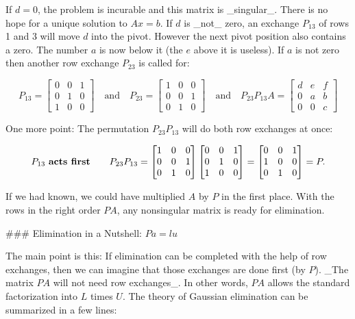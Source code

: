 If \(d=0\), the problem is incurable and this matrix is _singular_. There is no hope for a unique solution to \(Ax=b\). If \(d\) is _not_ zero, an exchange \(P_{13}\) of rows 1 and 3 will move \(d\) into the pivot. However the next pivot position also contains a zero. The number \(a\) is now below it (the \(e\) above it is useless). If \(a\) is not zero then another row exchange \(P_{23}\) is called for:

\[P_{13}=\begin{bmatrix}0&0&1\\ 0&1&0\\ 1&0&0\end{bmatrix}\quad\text{and}\quad P_{23}=\begin{bmatrix}1&0&0\\ 0&0&1\\ 0&1&0\end{bmatrix}\quad\text{and}\quad P_{23}P_{13}A=\begin{bmatrix}d&e&f\\ 0&a&b\\ 0&0&c\end{bmatrix}\]

One more point: The permutation \(P_{23}P_{13}\) will do both row exchanges at once:

\[P_{13}\ \text{\bf acts first}\qquad P_{23}P_{13}=\begin{bmatrix}1&0&0\\ 0&0&1\\ 0&1&0\end{bmatrix}\begin{bmatrix}0&0&1\\ 0&1&0\\ 1&0&0\end{bmatrix}=\begin{bmatrix}0&0&1\\ 1&0&0\\ 0&1&0\end{bmatrix}=P.\]

If we had known, we could have multiplied \(A\) by \(P\) in the first place. With the rows in the right order \(PA\), any nonsingular matrix is ready for elimination.

### Elimination in a Nutshell: \(Pa=lu\)

The main point is this: If elimination can be completed with the help of row exchanges, then we can imagine that those exchanges are done first (by \(P\)). _The matrix \(PA\) will not need row exchanges_. In other words, \(PA\) allows the standard factorization into \(L\) times \(U\). The theory of Gaussian elimination can be summarized in a few lines:

